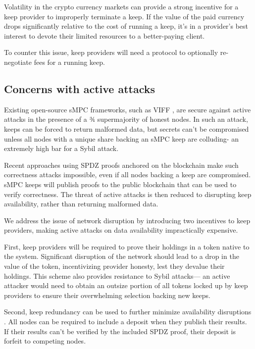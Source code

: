 \documentclass[11pt]{article}
\begin{document}
Volatility in the crypto currency markets can provide a strong
incentive for a keep provider to improperly terminate a keep. If the
value of the paid currency drops significantly relative to the cost of
running a keep, it's in a provider's best interest to devote their
limited resources to a better-paying client.

To counter this issue, keep providers will need a protocol to
optionally re-negotiate fees for a running keep.

\subsection{Concerns with active attacks}
\label{activeAttacks}

Existing open-source sMPC frameworks, such as VIFF \cite{viff}, are
secure against active attacks in the presence of a ¾ supermajority of
honest nodes. In such an attack, keeps can be forced to return
malformed data, but secrets can't be compromised unless all nodes with
a unique share backing an sMPC keep are colluding- an extremely high
bar for a Sybil attack.

Recent approaches using SPDZ proofs \cite{spdz} anchored on the
blockchain \cite{bitcoinSmpc, blockchainMultipartyComputation} make
such correctness attacks impossible, even if all nodes backing a keep
are compromised. sMPC keeps will publish proofs to the public
blockchain that can be used to verify correctness. The threat of
active attacks is then reduced to disrupting keep availability, rather
than returning malformed data.

We address the issue of network disruption by introducing two
incentives to keep providers, making active attacks on data
availability impractically expensive.

First, keep providers will be required to prove their holdings in a
token native to the system. Significant disruption of the network
should lead to a drop in the value of the token, incentivizing
provider honesty, lest they devalue their holdings. This scheme also
provides resistance to Sybil attacks--- an active attacker would need to
obtain an outsize portion of all tokens locked up by keep providers to
ensure their overwhelming selection backing new keeps.

Second, keep redundancy can be used to further minimize availability
disruptions \cite{blockchainMultipartyComputation}. All nodes can be
required to include a deposit when they publish their results. If
their results can't be verified by the included SPDZ proof, their
deposit is forfeit to competing nodes.
\end{document}
